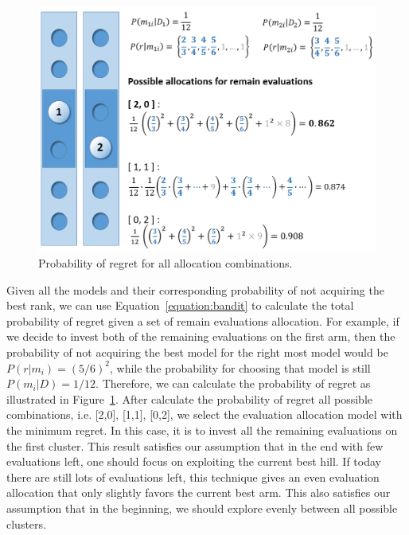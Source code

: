 \begin{figure}
\centering
\includegraphics[width=\textwidth]{Bandit_regret}
\caption{Probability of regret for all allocation combinations.}\label{fig:Bandit_regret}
\end{figure} 
Given all the models and their corresponding probability of not acquiring the best rank, 
we can use Equation~\ref{equation:bandit} to calculate the total probability of regret given a set of remain evaluations allocation.
For example, if we decide to invest both of the remaining evaluations on the first arm,
then the probability of not acquiring the best model for the right most model would be $P(r|m_i) = (5/6)^2$,
while the probability for choosing that model is still $P(m_i|D) = 1/12$.
Therefore, we can calculate the probability of regret as illustrated in Figure~\ref{fig:Bandit_regret}.
After calculate the probability of regret all possible combinations, i.e. [2,0], [1,1], [0,2], 
we select the evaluation allocation model with the minimum regret.
In this case, it is to invest all the remaining evaluations on the first cluster.
This result satisfies our assumption that in the end with few evaluations left, 
one should focus on exploiting the current best hill.
If today there are still lots of evaluations left, 
this technique gives an even evaluation allocation that only slightly favors the current best arm.
This also satisfies our assumption that in the beginning, we should explore evenly between all possible clusters.


